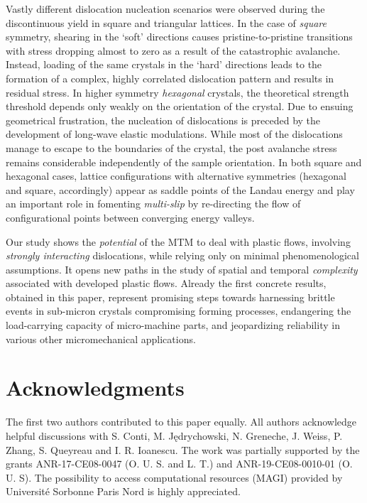 \documentclass[CRPHYS,Unicode,manuscript]{cedram}
\begin{document}
Vastly different dislocation  nucleation scenarios  were observed during  the discontinuous yield    in square and triangular lattices. In the case of \emph{square} symmetry,  shearing  in the `soft' directions  causes  pristine-to-pristine transitions with stress dropping almost to zero as a result of the  catastrophic avalanche. Instead, loading of the same crystals in the  `hard' directions leads to the formation of a complex, highly correlated  dislocation pattern and results in residual stress. In   higher symmetry   \emph{hexagonal} crystals,  the theoretical strength  threshold  depends only weakly on the orientation of the crystal. Due to ensuing  geometrical frustration,  the nucleation of dislocations is preceded  by  the development of long-wave elastic modulations. While most of the dislocations manage to escape  to the boundaries of the crystal, the post avalanche  stress remains  considerable independently of the sample orientation. In both square and hexagonal cases, lattice configurations  with alternative  symmetries (hexagonal and square, accordingly)  appear  as saddle points of the Landau energy and   play an important role in fomenting  \emph{multi-slip} by re-directing the flow of configurational points between converging  energy valleys.

Our study shows the \emph{potential} of the MTM to deal with plastic flows, involving \emph{strongly interacting }dislocations, while relying only on minimal phenomenological assumptions. It opens new paths in the study of spatial and temporal \emph{complexity} associated with developed plastic flows. Already the first concrete results,  obtained in this paper, represent promising steps towards harnessing brittle events in sub-micron crystals compromising forming processes, endangering the load-carrying capacity of micro-machine parts, and jeopardizing reliability in various other micromechanical applications.
 
 

\section{ Acknowledgments}
The first two authors contributed to this paper equally.  All authors acknowledge  helpful discussions with S. Conti, M. Jędrychowski, N. Greneche, J. Weiss, P. Zhang, S. Queyreau   and I. R. Ioanescu. The work was partially supported by the grants ANR-17-CE08-0047 (O. U. S. and L. T.) and ANR-19-CE08-0010-01 (O. U. S). The possibility to access  computational resources (MAGI)   provided by  Université Sorbonne Paris Nord is highly appreciated.

  
\end{document}
